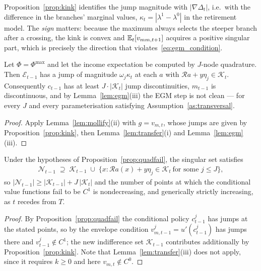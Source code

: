 Proposition~\ref{prop:kink} identifies the jump magnitude with $|\nabla\Delta_t|$,
i.e.\ with the difference in the branches' marginal values,
$\kappa_t=|\lambda^{1}-\lambda^{0}|$ in the retirement model. The \emph{sign} matters:
because the maximum always selects the steeper branch after a crossing, the kink is
convex and $\mathbb{E}_t[v_{mm,t+1}]$ acquires a positive singular part, which is precisely the
direction that violates~\eqref{eq:egm_condition}.

\begin{proposition}
\label{prop:quadfail}
Let $\Phi=\Phi^{\max}$ and let the income expectation be computed by $J$-node
quadrature. Then $\mathcal{E}_{t-1}$ has a jump of magnitude $\omega_j\kappa_t$ at each
$a$ with $\mathcal{R}a+y\eta_j\in\mathcal{K}_t$. Consequently $c_{t-1}$ has at least
$J\cdot|\mathcal{K}_t|$ jump discontinuities, $m_{t-1}$ is discontinuous, and by
Lemma~\ref{lem:egm}(iii) the EGM step is not clean --- for every $J$ and every
parameterisation satisfying Assumption~\ref{as:transversal}.
\end{proposition}

\begin{proof}
Apply Lemma~\ref{lem:mollify}(ii) with $g=v_{m,t}$, whose jumps are given by
Proposition~\ref{prop:kink}, then Lemma~\ref{lem:transfer}(i) and
Lemma~\ref{lem:egm}(iii).
\end{proof}

\begin{proposition}[Accumulation]
\label{prop:accumulate}
Under the hypotheses of Proposition~\ref{prop:quadfail}, the singular set satisfies
\begin{align}
\mathcal{N}_{t-1} \;\supseteq\; \mathcal{K}_{t-1}\;\cup\;
\big\{x : \mathcal{R}a(x)+y\eta_j \in \mathcal{K}_{t}\ \text{for some } j\le J\big\},
\end{align}
so $|\mathcal{N}_{t-1}|\ge |\mathcal{K}_{t-1}| + J\,|\mathcal{K}_{t}|$ and the number of
points at which the conditional value functions fail to be $C^{1}$ is nondecreasing,
and generically strictly increasing, as $t$ recedes from $T$.
\end{proposition}

\begin{proof}
By Proposition~\ref{prop:quadfail} the conditional policy $c_{t-1}^{j}$ has jumps at
the stated points, so by the envelope condition $v_{m,t-1}^{j}=u'(c_{t-1}^{j})$ has
jumps there and $v_{t-1}^{j}\notin C^{1}$; the new indifference set
$\mathcal{K}_{t-1}$ contributes additionally by Proposition~\ref{prop:kink}. Note that
Lemma~\ref{lem:transfer}(iii) does not apply, since it requires $k\ge0$ and here
$v_{m,t}\notin C^{0}$.
\end{proof}

